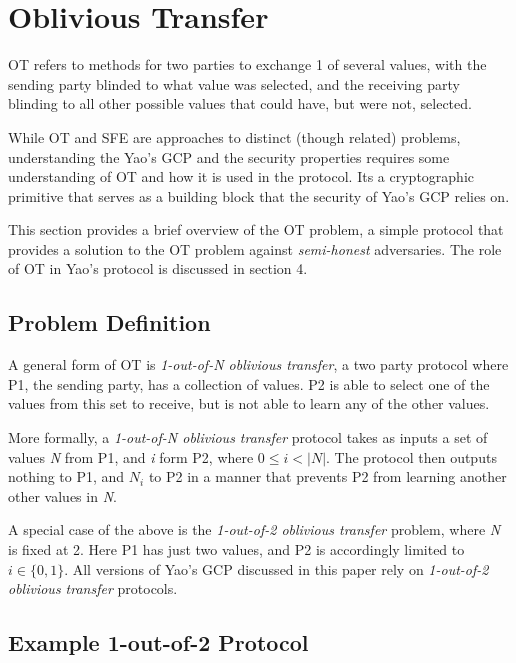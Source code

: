 \section{Oblivious Transfer}
\label{sec:ot}

\ac{OT} refers to methods for two parties to exchange 1 of several values, with the sending party blinded to what value was selected, and the receiving party blinding to all other possible values that could have, but were not, selected.

While \ac{OT} and \ac{SFE} are approaches to distinct (though related) problems, understanding the Yao's \ac{GCP} and the security properties requires some understanding of \ac{OT} and how it is used in the protocol. Its a cryptographic primitive that serves as a building block that the security of Yao's \ac{GCP} relies on.

This section provides a brief overview of the \ac{OT} problem, a simple protocol that provides a solution to the \ac{OT} problem against \emph{semi-honest} adversaries. The role of \ac{OT} in Yao's protocol is discussed in section 4.

\subsection{Problem Definition}

A general form of \ac{OT} is \emph{1-out-of-N oblivious transfer}, a two party protocol where \ac{P1}, the sending party, has a collection of values. \ac{P2} is able to select one of the values from this set to receive, but is not able to learn any of the other values.

More formally, a \emph{1-out-of-N oblivious transfer} protocol takes as inputs a set of values \emph{N} from \ac{P1}, and \emph{i} form \ac{P2}, where
$0 \leq i < |N|$. The protocol then outputs nothing to \ac{P1}, and $N_i$ to \ac{P2} in a manner that prevents \ac{P2} from learning another other values in \emph{N}.

A special case of the above is the \emph{1-out-of-2 oblivious transfer} problem, where \emph{N} is fixed at 2.  Here \ac{P1} has just two values, and \ac{P2} is accordingly limited to $i \in \{0, 1\}$.  All versions of Yao's \ac{GCP} discussed in this paper rely on \emph{1-out-of-2 oblivious transfer} protocols.

\subsection{Example 1-out-of-2 Protocol}

